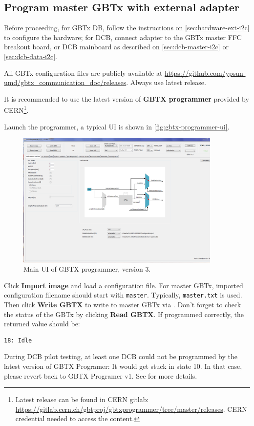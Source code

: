 \subsection{Program master GBTx with external \itwoc adapter}
Before proceeding, for GBTx DB, follow the instructions on
\autoref{sec:hardware-ext-i2c} to configure the hardware;
for DCB, connect \itwoc adapter to the GBTx master FFC breakout board, or DCB
mainboard as described on \autoref{sec:dcb-master-i2c} or
\autoref{sec:dcb-data-i2c}.

All GBTx configuration files are publicly available at
\url{https://github.com/ypsun-umd/gbtx_communication_doc/releases}.
Always use latest release.

It is recommended to use the latest version of \textbf{GBTX programmer} provided
by CERN\footnote{
    Latest release can be found in CERN gitlab:
    \url{https://gitlab.cern.ch/gbtproj/gbtxprogrammer/tree/master/releases}.
    CERN credential needed to access the content.
}.

Launch the programmer, a typical UI is shown in
\autoref{fig:gbtx-programmer-ui}.

\begin{figure}[!ht]
    \centering
    \includegraphics[width=0.9\textwidth]{res/gbtx_programmer_v3_ui.png}
    \caption{Main UI of GBTX programmer, version 3.}
    \label{fig:gbtx-programmer-ui}
\end{figure}

Click \textbf{Import image} and load a configuration file.
For master GBTx, imported configuration filename should start with
\texttt{master}.
Typically, \texttt{master.txt} is used.
Then click \textbf{Write GBTX} to write to master GBTx via \itwoc.
Don't forget to check the status of the GBTx by clicking \textbf{Read GBTX}.
If programmed correctly, the returned value should be:

\begin{lstlisting}
18: Idle
\end{lstlisting}

\begin{leftbar}
    During DCB pilot testing, at least one DCB could not be programmed by the
    latest version of GBTX Programer: It would get stuck in state 10.
    In that case, please revert back to GBTX Programer v1.
    See  for more details.
\end{leftbar}
